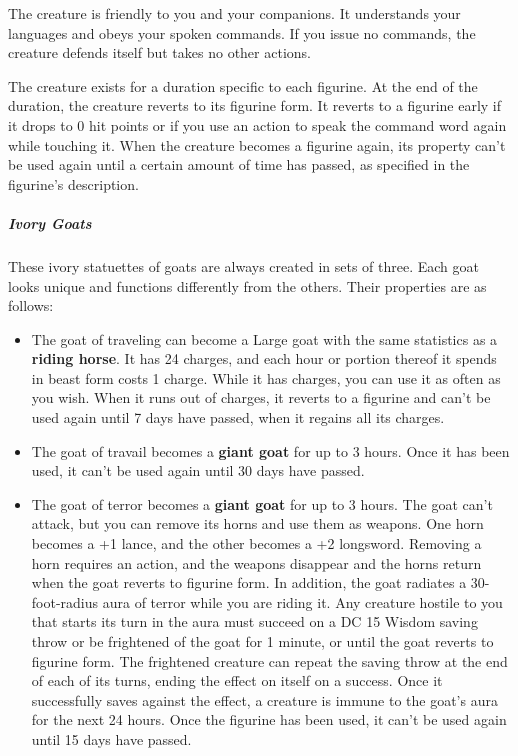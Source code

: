 \documentclass[10pt,a4paper,twoside,bg=print,twocolumn,openany,nodeprecatedcode]{dndbook}
\begin{document}
The creature is friendly to you and your companions. It understands your languages and obeys your spoken commands. If you issue no commands, the creature defends itself but takes no other actions.

The creature exists for a duration specific to each figurine. At the end of the duration, the creature reverts to its figurine form. It reverts to a figurine early if it drops to 0 hit points or if you use an action to speak the command word again while touching it. When the creature becomes a figurine again, its property can't be used again until a certain amount of time has passed, as specified in the figurine's description.

\subparagraph{Ivory Goats}
These ivory statuettes of goats are always created in sets of three. Each goat looks unique and functions differently from the others. Their properties are as follows:


\begin{itemize}
\item The goat of traveling can become a Large goat with the same statistics as a \textbf{riding horse}. It has 24 charges, and each hour or portion thereof it spends in beast form costs 1 charge. While it has charges, you can use it as often as you wish. When it runs out of charges, it reverts to a figurine and can't be used again until 7 days have passed, when it regains all its charges.
\item The goat of travail becomes a \textbf{giant goat} for up to 3 hours. Once it has been used, it can't be used again until 30 days have passed.
\item The goat of terror becomes a \textbf{giant goat} for up to 3 hours. The goat can't attack, but you can remove its horns and use them as weapons. One horn becomes a +1 lance, and the other becomes a +2 longsword. Removing a horn requires an action, and the weapons disappear and the horns return when the goat reverts to figurine form. In addition, the goat radiates a 30-foot-radius aura of terror while you are riding it. Any creature hostile to you that starts its turn in the aura must succeed on a DC 15 Wisdom saving throw or be frightened of the goat for 1 minute, or until the goat reverts to figurine form. The frightened creature can repeat the saving throw at the end of each of its turns, ending the effect on itself on a success. Once it successfully saves against the effect, a creature is immune to the goat's aura for the next 24 hours. Once the figurine has been used, it can't be used again until 15 days have passed.
\end{itemize}
\end{document}
